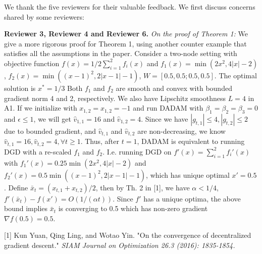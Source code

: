 \documentclass{article}
\begin{document}
We thank the five reviewers for their valuable feedback. We first discuss concerns shared by some reviewers:\vspace{-5pt}

\textbf{Reviewer 3, Reviewer 4 and Reviewer 6.} \textit{On the proof of Theorem 1:} We give a more rigorous proof for Theorem 1, using another counter example that satisfies all the assumptions in the paper. Consider a two-node setting with objective function $f(x) =1/2 \sum_{i=1}^2 f_i(x)$ and $f_1(x) =  \min(2x^2, 4|x|-2)$, $f_2(x) =  \min((x-1)^2, 2|x-1|-1)$, $W = [0.5,0.5;0.5,0.5]$. The optimal solution is $x^* = 1/3$ Both $f_1$ and $f_2$ are smooth and convex with bounded gradient norm 4 and 2, respectively. We also have Lipschitz smoothness $L = 4$ in A1. 
If we initialize with $x_{1,2} = x_{1,2} = -1$ and run DADAM with $\beta_1 = \beta_2 =\beta_3 = 0$ and $\epsilon \leq 1$, we will get $\hat v_{1,1} = 16$ and $\hat v_{1,2} = 4$. Since we have $|g_{t,1}| \leq 4, |g_{t,2}| \leq 2$ due to bounded gradient, and $\hat v_{t,1}$ and $\hat v_{t,2}$ are non-decreasing, we know $\hat v_{t,1} = 16, \hat v_{t,2}=4, \forall t \geq 1$. Thus, after $t=1$, DADAM is equivalent to running DGD with a re-scaled $f_1$ and $f_2$. I.e. running DGD on  
$f'(x) = \sum_{i=1}^2 f_i'(x)$ with $f_1'(x) =  0.25\min(2x^2, 4|x|-2)$ and $f_2'(x) = 0.5  \min((x-1)^2, 2|x-1|-1)$, which has unique optimal $x'=0.5$. 
Define $\bar x_t = (x_{t,1}+x_{t,2})/2$, then by Th. 2 in [1], we have $\alpha < 1/4$, $f'(\bar x_t) - f(x') = O(1/(\alpha t))$. 
Since $f'$ has a unique optima, the above bound implies $\bar x_t$ is converging to 0.5 which has non-zero gradient $\nabla f(0.5) = 0.5$.\vspace{-5pt}

[1]  Kun Yuan, Qing Ling, and Wotao Yin. "On the convergence of decentralized gradient descent." \textit{SIAM Journal on Optimization 26.3 (2016): 1835-1854.}\vspace{-5pt}

\end{document}
